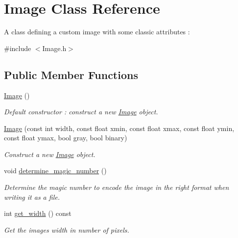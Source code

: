 \hypertarget{classImage}{}\section{Image Class Reference}
\label{classImage}


A class defining a custom image with some classic attributes \+:  




{\ttfamily \#include $<$Image.\+h$>$}

\subsection*{Public Member Functions}
\begin{DoxyCompactItemize}
\item 
\mbox{\label{classImage_a58edd1c45b4faeb5f789b0d036d02313}} 
\hyperlink{classImage_a58edd1c45b4faeb5f789b0d036d02313}{Image} ()
\begin{DoxyCompactList}\small\item\em Default constructor \+: construct a new \hyperlink{classImage}{Image} object. \end{DoxyCompactList}\item 
\hyperlink{classImage_a05264c84d006ceb2e4f4405561999c5f}{Image} (const int width, const float xmin, const float xmax, const float ymin, const float ymax, bool gray, bool binary)
\begin{DoxyCompactList}\small\item\em Construct a new \hyperlink{classImage}{Image} object. \end{DoxyCompactList}\item 
\mbox{\label{classImage_aacd6d371d5f6d56a0c4070b0fbfb1f03}} 
void \hyperlink{classImage_aacd6d371d5f6d56a0c4070b0fbfb1f03}{determine\+\_\+magic\+\_\+number} ()
\begin{DoxyCompactList}\small\item\em Determine the magic number to encode the image in the right format when writing it as a file. \end{DoxyCompactList}\item 
int \hyperlink{classImage_a1642b1ab6e1c8d15c78a59557642c20f}{get\+\_\+width} () const
\begin{DoxyCompactList}\small\item\em Get the image\textquotesingle{}s width in number of pixels. \end{DoxyCompactList}\item 

\end{DoxyCompactItemize}

